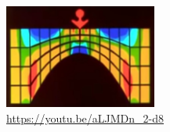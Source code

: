 
\begin{center}
\includegraphics[width=5cm]{images/youtube/superold}\\
\url{https://youtu.be/aLJMDn_2-d8}
\end{center}
